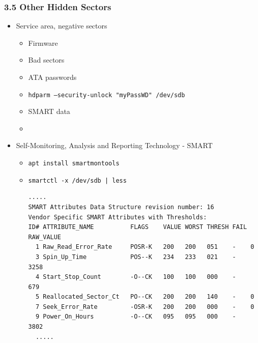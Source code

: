\begin{frame}[fragile]
  \frametitle{3.5 Other Hidden Sectors}
    \begin{itemize}
        \item Service area, negative sectors
        \begin{itemize}
            \item Firmware
            \item Bad sectors
            \item ATA passwords
            \item[] \texttt{hdparm --security-unlock "myPassWD" /dev/sdb}
            \item SMART data
	    \item[]
        \end{itemize}
        \item Self-Monitoring, Analysis and Reporting Technology - SMART
        \begin{itemize}
            \item[] \texttt{apt install smartmontools}
            \item[] \texttt{smartctl -x /dev/sdb | less}
\begin{lstlisting}[basicstyle=\tiny]
.....
SMART Attributes Data Structure revision number: 16
Vendor Specific SMART Attributes with Thresholds:
ID# ATTRIBUTE_NAME          FLAGS    VALUE WORST THRESH FAIL RAW_VALUE
  1 Raw_Read_Error_Rate     POSR-K   200   200   051    -    0
  3 Spin_Up_Time            POS--K   234   233   021    -    3258
  4 Start_Stop_Count        -O--CK   100   100   000    -    679
  5 Reallocated_Sector_Ct   PO--CK   200   200   140    -    0
  7 Seek_Error_Rate         -OSR-K   200   200   000    -    0
  9 Power_On_Hours          -O--CK   095   095   000    -    3802
  .....
\end{lstlisting}
        \end{itemize}
    \end{itemize}
\end{frame}


